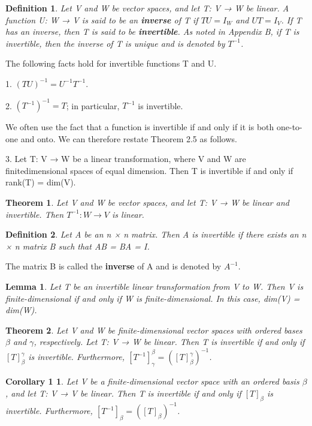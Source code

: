 \documentclass{article}
\newcommand{\bd}[1]{\textbf{#1}}
\theoremstyle{plain}
\newtheorem{theorem}{Theorem}[section]
\newtheorem*{lemma}{Lemma}
\newtheorem*{corollary1}{Corollary 1}
\newtheorem*{definition1}{Definition}
\theoremstyle{plain} %
\begin{document}
\begin{definition1}
Let V and W be vector spaces, and let T: V → W be linear. A function U: W → V is said to be an \bd{inverse} of T if $TU = I_W$ and $UT = I_V$. If T has an inverse, then T is said to be \bd{invertible}. As noted in Appendix B, if T is invertible, then the inverse of T is unique and is denoted by $T^{-1}$.
\end{definition1}

The following facts hold for invertible functions T and U.

1. $(TU)^{-1} = U^{-1}T^{-1}$.

2. $(T^{-1})^{-1} = T$; in particular, $T^{-1}$ is invertible.

We often use the fact that a function is invertible if and only if it is both
one-to-one and onto. We can therefore restate Theorem 2.5 as follows.

3. Let T: V → W be a linear transformation, where V and W are finitedimensional spaces of equal dimension. Then T is invertible if and only if rank(T) = dim(V).

\begin{theorem}
Let V and W be vector spaces, and let T: V → W be linear and invertible. Then $T^{-1} : W \to V$ is linear.
\end{theorem}

\begin{definition1}
Let A be an n × n matrix. Then A is invertible if there exists an n × n matrix B such that AB = BA = I.
\end{definition1}

The matrix B is called the \bd{inverse} of A and is denoted by $A^{-1}$.

\begin{lemma}
Let T be an invertible linear transformation from V to W. Then V is finite-dimensional if and only if W is finite-dimensional. In this case, dim(V) = dim(W).
\end{lemma}

\begin{theorem}
Let V and W be finite-dimensional vector spaces with ordered bases $\beta$ and $\gamma$, respectively. Let T: V → W be linear. Then T is invertible if and only if $[T]_\beta^\gamma$ is invertible. Furthermore, $[T^{-1}]_\gamma^\beta = ([T]_\beta^\gamma)^{-1}$.
\end{theorem}

\begin{corollary1}
Let V be a finite-dimensional vector space with an ordered basis $\beta$, and let T: V → V be linear. Then T is invertible if and only if $[T]_\beta$ is invertible. Furthermore, $[T^{-1}]_\beta = ([T]_\beta)^{-1}$.
\end{corollary1}
\end{document}

